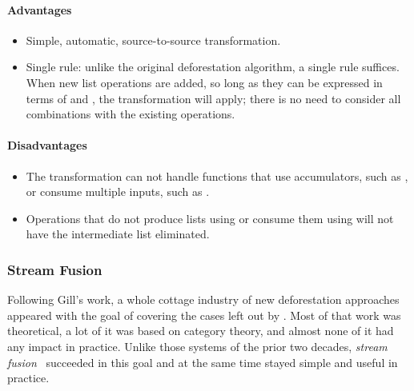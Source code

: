 \paragraph{Advantages}
\begin{itemize}
    \item Simple, automatic, source-to-source transformation.


    \item Single rule: unlike the original deforestation algorithm, a single
        rule suffices. When new list operations are added, so long as they can
        be expressed in terms of  and , the
        transformation will apply; there is no need to consider all combinations
        with the existing operations.
\end{itemize}

\paragraph{Disadvantages}
\begin{itemize}
    \item The transformation can not handle functions that use accumulators,
        such as , or consume multiple inputs, such as
        .

    \item Operations that do not produce lists using  or consume
        them using  will not have the intermediate list
        eliminated.
\end{itemize}


\subsubsection{Stream Fusion}

Following Gill's work, a whole cottage industry of new deforestation approaches
appeared with the goal of covering the cases left out by
. Most of that work was
theoretical, a lot of it was based on category theory, and almost none of it had
any impact in practice. Unlike those systems of the prior two decades,
\emph{stream fusion}~\cite{Coutts:2007kp} succeeded in this
goal and at the same time stayed simple and useful in practice.

